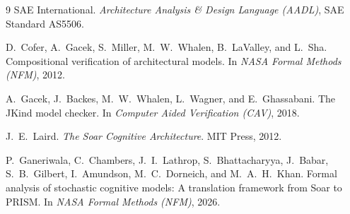 \documentclass[11pt,letterpaper]{article}
\begin{document}
\label{sec:refs}
\renewcommand{\refname}{\Large References}
\begin{thebibliography}{9}
\small
{} SAE International. \emph{Architecture Analysis \& Design Language (AADL)}, SAE Standard AS5506.

 D.~Cofer, A.~Gacek, S.~Miller, M.~W.~Whalen, B.~LaValley, and L.~Sha. Compositional verification of architectural models. In \emph{NASA Formal Methods (NFM)}, 2012.

 A.~Gacek, J.~Backes, M.~W.~Whalen, L.~Wagner, and E.~Ghassabani. The JKind model checker. In \emph{Computer Aided Verification (CAV)}, 2018.

 J.~E.~Laird. \emph{The Soar Cognitive Architecture}. MIT Press, 2012.

 P.~Ganeriwala, C.~Chambers, J.~I.~Lathrop, S.~Bhattacharyya, J.~Babar, S.~B.~Gilbert, I.~Amundson, M.~C.~Dorneich, and M.~A.~H.~Khan. Formal analysis of stochastic cognitive models: A translation framework from Soar to PRISM. In \emph{NASA Formal Methods (NFM)}, 2026.
\end{thebibliography}
\end{document}
